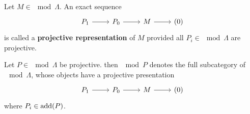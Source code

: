 
\begin{definition}
  Let $M \in \mod{\Lambda}$. An exact sequence
    \[\begin{tikzcd}
        P_1 \rar& P_0 \rar& M \rar & (0)
      \end{tikzcd}\]
  is called a \textbf{projective representation} of $M$ provided all $P_i \in \mod{\Lambda}$ are
  projective.
\end{definition}


\begin{definition}
  Let $P \in \mod{\Lambda}$ be projective. then $\mod{P}$ denotes the full subcategory
  of $\mod{\Lambda}$, whose objects have a projective presentation
    \[\begin{tikzcd}
        P_1 \rar& P_0 \rar& M \rar& (0)
      \end{tikzcd}\]
  where $P_i \in \operatorname{add}(P)$.
\end{definition}


